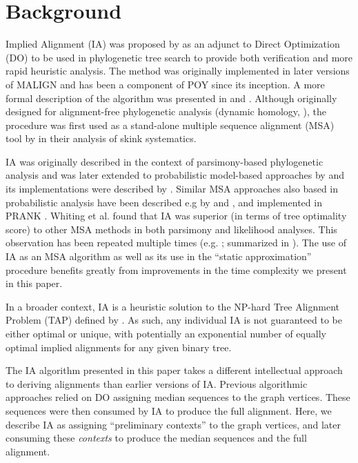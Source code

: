 \documentclass{bmcart}
\begin{document}
\newpage


\section*{Background}

Implied Alignment (IA) was proposed by \cite{Wheeler2003} as an adjunct to Direct Optimization (DO) \citep{Wheeler1996,VaronandWheeler2012} to be used in phylogenetic tree search to provide both verification and more rapid heuristic analysis.
The method was originally implemented in later versions of MALIGN \citep{Wheeler1991-1998} and has been a component of POY \citep{Wheeleretal2015, POY2, POY3, POY5, Wheeleretal2006} since its inception.
A more formal description of the algorithm was presented in \cite{Wheeleretal2006} and \cite{VaronandWheeler2012}.
Although originally designed for alignment-free phylogenetic analysis (dynamic homology, \citealp{Wheeler2001}), the procedure was first used as a stand-alone multiple sequence alignment (MSA) tool by \cite{WhitingAetal2006} in their analysis of skink systematics.

IA was originally described in the context of parsimony-based phylogenetic analysis and was later extended to probabilistic model-based approaches by \cite{Wheeler2006} and its implementations were described by \citep{Varonetal2010,Wheeleretal2015}.
Similar MSA approaches also based in probabilistic analysis have been described e.g by \cite{Loytynoja2005} and \cite{Paten2008}, and implemented in PRANK \citep{PRANK}.
Whiting et al. found that IA was superior (in terms of tree optimality score) to other MSA methods in both parsimony and likelihood analyses.
This observation has been repeated multiple times (e.g. \citealp{LindgrenandDaly2007, Lehtonen2008, WheelerandGiribet2009, FordandWheeler2015}; summarized in \citealp{Wheeler2012}).
The use of IA as an MSA algorithm as well as its use in the ``static approximation'' procedure \citep{Wheeler2003b} benefits greatly from improvements in the time complexity we present in this paper.

In a broader context, IA is a heuristic solution to the NP-hard Tree Alignment Problem (TAP) defined by \cite{sankoff1975}.
As such, any individual IA is not guaranteed to be either optimal or unique, with potentially an exponential number of equally optimal implied alignments for any given binary tree.

The IA algorithm presented in this paper takes a different intellectual approach to deriving alignments than earlier versions of IA.
Previous algorithmic approaches relied on DO assigning median sequences to the graph vertices. These sequences were then consumed by IA to produce the full alignment.
Here, we describe IA as assigning ``preliminary contexts'' to the graph vertices, and later consuming these \textit{contexts} to produce the median sequences and the full alignment.
\end{document}
